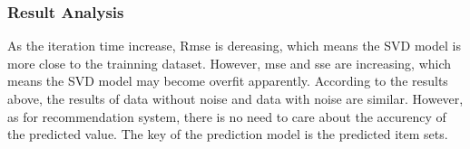 \documentclass[]{article}
\begin{document}
\subsubsection{Result Analysis}
 As the iteration time increase, Rmse is dereasing, which means the SVD model is more close to the trainning dataset. However, mse and sse are increasing, which means the SVD model may become overfit apparently. According to the results above, the results of data without noise and data with noise are similar. However, as for recommendation system, there is no need to care about the accurency of the predicted value. The key of the prediction model is the predicted item sets. 
\end{document}
